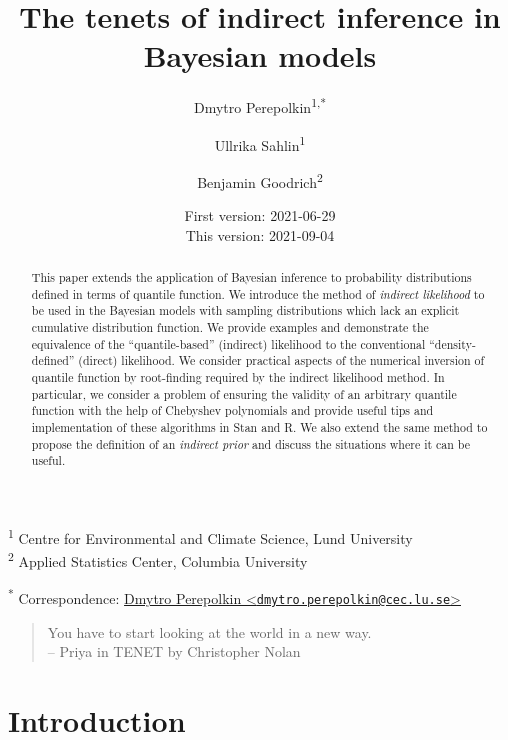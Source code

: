 \documentclass[
  12pt,
]{article}
\title{\vspace{1cm}The tenets of indirect inference in Bayesian models\vspace{0.5cm}}
\author{Dmytro Perepolkin\textsuperscript{1,*} \and Ullrika Sahlin\textsuperscript{1} \and Benjamin Goodrich\textsuperscript{2}}
\date{First version: 2021-06-29\\
This version: 2021-09-04}
\begin{document}
\maketitle
\begin{abstract}
\noindent{}
This paper extends the application of Bayesian inference to probability distributions defined in terms of quantile function. We introduce the method of \emph{indirect likelihood} to be used in the Bayesian models with sampling distributions which lack an explicit cumulative distribution function. We provide examples and demonstrate the equivalence of the ``quantile-based'' (indirect) likelihood to the conventional ``density-defined'' (direct) likelihood. We consider practical aspects of the numerical inversion of quantile function by root-finding required by the indirect likelihood method. In particular, we consider a problem of ensuring the validity of an arbitrary quantile function with the help of Chebyshev polynomials and provide useful tips and implementation of these algorithms in Stan and R. We also extend the same method to propose the definition of an \emph{indirect prior} and discuss the situations where it can be useful. \vspace{.8cm}
\end{abstract}

\textsuperscript{1} Centre for Environmental and Climate Science, Lund University\\
\textsuperscript{2} Applied Statistics Center, Columbia University

\textsuperscript{*} Correspondence: \href{mailto:dmytro.perepolkin@cec.lu.se}{Dmytro Perepolkin \textless{}\href{mailto:dmytro.perepolkin@cec.lu.se}{\nolinkurl{dmytro.perepolkin@cec.lu.se}}\textgreater{}}

\setcounter{tocdepth}{4}
\tableofcontents
\renewcommand{\[}{\begin{equation}}
\renewcommand{\]}{\end{equation}}

\begin {quotation}
You have to start looking at the world in a new way.\\ 
-- Priya in TENET by Christopher Nolan 
\end{quotation}

\hypertarget{introduction}{%
\section{Introduction}\label{introduction}}
\end{document}
